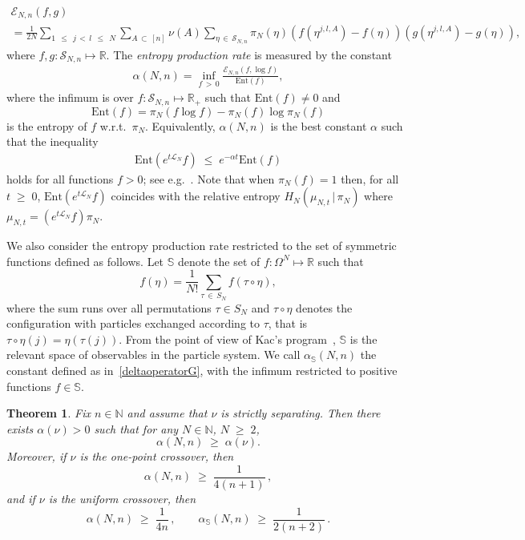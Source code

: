 \documentclass[10pt,a4paper]{amsart}
\renewcommand{\leq}{\;\leqslant\;}
\renewcommand{\geq}{\;\geqslant\;}
\newcommand{\tc}{\, |\, }
\newcommand{\ent}{\mathrm{Ent}}
\newcommand{\cE}{\mathcal{E}}
\newcommand{\cL}{\mathcal{L}}
\newcommand{\cS}{\mathcal{S}}
\newcommand{\bbN}{\mathbb{N}}
\newcommand{\bbR}{\mathbb{R}}
\newcommand{\bbS}{\mathbb{S}}
\let\a=\alpha
\let\t=\tau
\let\O=\Omega
\newtheorem{theo}{Theorem}[section]
\theoremstyle{definition}
\theoremstyle{plain}
\numberwithin{equation}{section}
\begin{document}
\begin{multline}\label{operatorG}
\cE_{N,n}(f,g)\\
=\frac{1}{2N}\sum_{1\,\leq\,j\,<\,l\,\leq\,N}\sum_{A\,\subset\,[n]}\nu(A)
\sum_{\eta\,\in\,\cS_{N,n}}\pi_N(\eta)\left(f\left(\eta^{j,l,A}\right)-f(\eta)\right)\left(g\left(\eta^{j,l,A}\right)-g(\eta)\right),
\end{multline}
where $f,g:\cS_{N,n} \mapsto\bbR$. The \emph{entropy production rate} is measured by the constant
\begin{align}\label{deltaoperatorG}
\a(N,n) = \inf_{f\,>\,0} \frac{\cE_{N,n}(f,\log f)}{\ent(f)},
\end{align}
where the infimum is over $f:\cS_{N,n} \mapsto\bbR_+$ such that $\ent(f)\neq 0$ and
\[
\ent(f) = \pi_N(f\log f)-\pi_N(f)\log\pi_N(f)
\]
is the entropy of $f$ w.r.t.\ $\pi_N$.
Equivalently, $\a(N,n)$ is the best constant $\a$ such that the inequality
\begin{align}\label{gapoperatorG}
\ent\left(e^{t\cL_N}f\right)\leq e^{-\a t}\ent(f)
\end{align}
holds for all functions $f>0$; see e.g.~\cite{BT,DS}. Note that when $\pi_N(f)=1$ then, for all $t\geq 0$, $\ent(e^{t\cL_N}f)$ coincides with the relative entropy $H_N(\mu_{N,t}\tc\pi_N)$ where $\mu_{N,t} =(e^{t\cL_N}f)\pi_N$.

We also consider the entropy production rate restricted to the set of symmetric functions defined as follows. Let $\bbS$ denote the set of $f:\O^N\mapsto \bbR$ such that
\[
f(\eta)=\frac1{N!}\sum_{\t\,\in\,S_N} f(\t\circ\eta),
\]
where the sum runs over all permutations $\t\in S_N$ and $\t\circ\eta$ denotes the configuration with particles exchanged according to $\t$, that is $\t\circ\eta(j) = \eta(\t(j))$. From the point of view of Kac's program~\cite{KAC}, $\bbS$ is the relevant space of observables in the particle system. We call $\a_{\bbS}(N,n)$ the constant defined as in~\eqref{deltaoperatorG}, with the infimum restricted to positive functions $f\in\bbS$.

\setcounter{theo}{7}
\setcounter{equation}{14}
\begin{theo}
\label{th:ent}
Fix $n\in\bbN$ and assume that $\nu$ is strictly separating. Then there exists $\a(\nu)>0$ such that for any $N\in\bbN$, $N\geq 2$,
\begin{equation}\label{entao}
\a(N,n)\geq \a(\nu).
\end{equation}
Moreover, if $\nu$ is the one-point crossover, then
\begin{equation}\label{enta}
\a(N,n)\geq \frac{1}{4(n+1)}\,,
\end{equation}
and if $\nu$ is the uniform crossover, then
\begin{equation}\label{entas}
\a(N,n)\geq \frac{1}{4n}\,,\qquad \a_\bbS(N,n)\geq \frac1{2(n+2)}\,.
\end{equation}
\end{theo}
\end{document}
